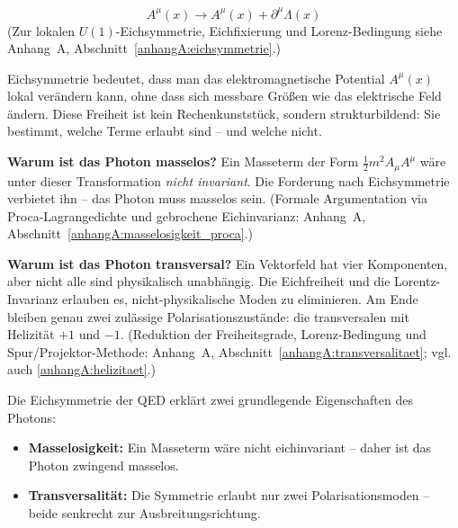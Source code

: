 \[
A^\mu(x) \rightarrow A^\mu(x) + \partial^\mu \Lambda(x)
\]
(Zur lokalen \(U(1)\)-Eichsymmetrie, Eichfixierung und \newline Lorenz-Bedingung siehe Anhang~A, Abschnitt~\ref{anhangA:eichsymmetrie}.)
\vspace{1em}
\begin{tcolorbox}[physikbox, title=Was bedeutet Eichsymmetrie?]
	\label{box:was bedeutet Eichsy}
	\small
	Eichsymmetrie bedeutet, dass man das elektromagnetische Potential \( A^\mu(x) \) lokal verändern kann, ohne dass sich messbare Größen wie das elektrische Feld ändern. Diese Freiheit ist kein Rechenkunststück, sondern strukturbildend: Sie bestimmt, welche Terme erlaubt sind – und welche nicht.
\end{tcolorbox}

\textbf{Warum ist das Photon masselos?}
Ein Masseterm der Form \( \frac{1}{2} m^2 A_\mu A^\mu \) wäre unter dieser Transformation \emph{nicht invariant}. Die Forderung nach Eichsymmetrie verbietet ihn – das Photon muss masselos sein.
(Formale Argumentation via Proca-Lagrange­dichte und gebrochene Eichinvarianz: Anhang~A, Abschnitt~\ref{anhangA:masselosigkeit_proca}.)

\textbf{Warum ist das Photon transversal?}
Ein Vektorfeld hat vier Komponenten, aber nicht alle sind physikalisch unabhängig. Die Eichfreiheit und die Lorentz-Invarianz erlauben es, nicht-physikalische Moden zu eliminieren. Am Ende bleiben genau zwei zulässige Polarisationszustände: die transversalen mit Helizität \( +1 \) und \( -1 \).
(Reduktion der Freiheitsgrade, Lorenz-Bedingung und Spur/Projektor-Methode: Anhang~A, Abschnitt~\ref{anhangA:transversalitaet}; vgl. auch \ref{anhangA:helizitaet}.)

\vspace{1em}
\begin{tcolorbox}[physikbox, title=Folgen der Eichsymmetrie]
	\label{box:folgen der Eichsy}
	\small
	Die Eichsymmetrie der QED erklärt zwei grundlegende Eigenschaften des Photons:
	
	\begin{itemize}
		\item \textbf{Masselosigkeit:} Ein Masseterm wäre nicht eichinvariant – daher ist das Photon zwingend masselos.
		\item \textbf{Transversalität:} Die Symmetrie erlaubt nur zwei Polarisationsmoden – beide senkrecht zur Ausbreitungsrichtung.
	\end{itemize}
\end{tcolorbox}

